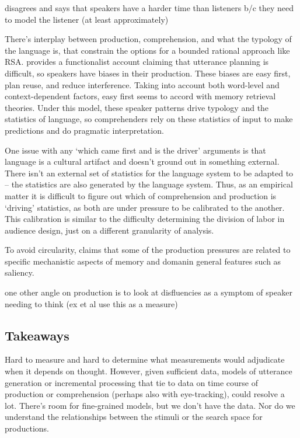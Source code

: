 \documentclass[]{article}
\begin{document}
\cite{heller2012} disagrees and says that speakers have a harder time than listeners b/c they need to model the listener (at least approximately) %

There's interplay between production, comprehension, and what the typology of the language is, that constrain the options for a bounded rational approach like RSA. \cite{macdonald2013} provides a functionalist account claiming that utterance planning is difficult, so speakers have biases in their production. These biases are easy first, plan reuse, and reduce interference. Taking into account both word-level and context-dependent factors, easy first seems to accord with memory retrieval theories. %
Under this model, these speaker patterns drive typology and the statistics of language, so comprehenders rely on these statistics of input to make predictions and do pragmatic interpretation. 



One issue with any `which came first and is the driver' arguments is that language is a cultural artifact and doesn't ground out in something external. There isn't an external set of statistics for the language system to be adapted to -- the statistics are also generated by the language system. Thus, as an empirical matter it is difficult to figure out which of comprehension and production is `driving' statistics, as both are under pressure to be calibrated to the another. This calibration is similar to the difficulty determining the division of labor in audience design, just on a different granularity of analysis. 

To avoid circularity, \cite{macdonald2013} claims that some of the production pressures are related to specific mechanistic aspects of memory and domanin general features such as saliency. %

one other angle on production is to look at disfluencies as a symptom of speaker needing to think (ex \cite{yoon2014} et al use this as a measure)

\subsection{Takeaways}
Hard to measure and hard to determine what measurements would adjudicate when it depends on thought. However, given sufficient data, models of utterance generation or incremental processing that tie to data on time course of production or comprehension (perhaps also with eye-tracking), could resolve a lot. There's room for fine-grained models, but we don't have the data. Nor do we understand the relationships between the stimuli or the search space for productions. 
\end{document}
